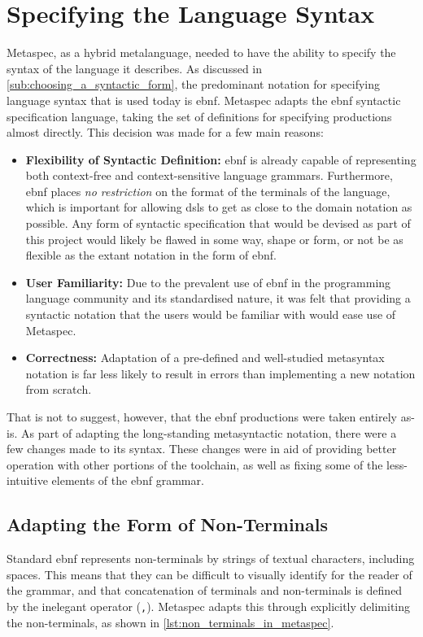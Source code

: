 \section{Specifying the Language Syntax} %
\label{sec:specifying_the_language_syntax}
Metaspec, as a hybrid metalanguage, needed to have the ability to specify the syntax of the language it describes. 
As discussed in \autoref{sub:choosing_a_syntactic_form}, the predominant notation for specifying language syntax that is used today is \gls{ebnf}.
Metaspec adapts the \gls{ebnf} syntactic specification language, taking the set of definitions for specifying productions almost directly.
This decision was made for a few main reasons:
\begin{itemize}
    \item \textbf{Flexibility of Syntactic Definition:} \gls{ebnf} is already capable of representing both context-free and context-sensitive language grammars.
    Furthermore, \gls{ebnf} places \textit{no restriction} on the format of the terminals of the language, which is important for allowing \glspl{dsl} to get as close to the domain notation as possible. 
    Any form of syntactic specification that would be devised as part of this project would likely be flawed in some way, shape or form, or not be as flexible as the extant notation in the form of \gls{ebnf}. 
    \item \textbf{User Familiarity:} Due to the prevalent use of \gls{ebnf} in the programming language community and its standardised nature, it was felt that providing a syntactic notation that the users would be familiar with would ease use of Metaspec. 
    \item \textbf{Correctness:} Adaptation of a pre-defined and well-studied metasyntax notation is far less likely to result in errors than implementing a new notation from scratch.
\end{itemize}

That is not to suggest, however, that the \gls{ebnf} productions were taken entirely as-is. 
As part of adapting the long-standing metasyntactic notation, there were a few changes made to its syntax.
These changes were in aid of providing better operation with other portions of the toolchain, as well as fixing some of the less-intuitive elements of the \gls{ebnf} grammar. 

\subsection{Adapting the Form of Non-Terminals} %
\label{sub:adapting_the_form_of_non_terminals}
Standard \gls{ebnf} represents non-terminals by strings of textual characters, including spaces.
This means that they can be difficult to visually identify for the reader of the grammar, and that concatenation of terminals and non-terminals is defined by the inelegant operator (\texttt{,}).
Metaspec adapts this through explicitly delimiting the non-terminals, as shown in \autoref{lst:non_terminals_in_metaspec}.

